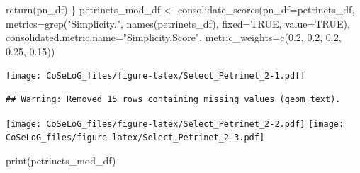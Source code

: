 \documentclass[]{article}
\newenvironment{Shaded}{\begin{snugshade}}{\end{snugshade}}
\newcommand{\KeywordTok}[1]{\textcolor[rgb]{0.94,0.87,0.69}{{#1}}}
\newcommand{\DataTypeTok}[1]{\textcolor[rgb]{0.87,0.87,0.75}{{#1}}}
\newcommand{\FloatTok}[1]{\textcolor[rgb]{0.75,0.75,0.82}{{#1}}}
\newcommand{\StringTok}[1]{\textcolor[rgb]{0.80,0.58,0.58}{{#1}}}
\newcommand{\OtherTok}[1]{\textcolor[rgb]{0.94,0.94,0.56}{{#1}}}
\newcommand{\NormalTok}[1]{\textcolor[rgb]{0.80,0.80,0.80}{{#1}}}
\begin{document}
\begin{Shaded}
\begin{Highlighting}[]
    \KeywordTok{return}\NormalTok{(pn_df)}
\NormalTok{\}}
\NormalTok{petrinets_mod_df <-}\StringTok{ }\KeywordTok{consolidate_scores}\NormalTok{(}\DataTypeTok{pn_df=}\NormalTok{petrinets_df, }
        \DataTypeTok{metrics=}\KeywordTok{grep}\NormalTok{(}\StringTok{"Simplicity."}\NormalTok{, }\KeywordTok{names}\NormalTok{(petrinets_df), }\DataTypeTok{fixed=}\OtherTok{TRUE}\NormalTok{, }\DataTypeTok{value=}\OtherTok{TRUE}\NormalTok{), }
        \DataTypeTok{consolidated.metric.name=}\StringTok{"Simplicity.Score"}\NormalTok{,}
        \DataTypeTok{metric_weights=}\KeywordTok{c}\NormalTok{(}\FloatTok{0.2}\NormalTok{, }\FloatTok{0.2}\NormalTok{, }\FloatTok{0.2}\NormalTok{, }\FloatTok{0.25}\NormalTok{, }\FloatTok{0.15}\NormalTok{))}
\end{Highlighting}
\end{Shaded}

\texttt{[image: CoSeLoG\_files/figure-latex/Select\_Petrinet\_2-1.pdf]}

\begin{verbatim}
## Warning: Removed 15 rows containing missing values (geom_text).
\end{verbatim}

\texttt{[image: CoSeLoG\_files/figure-latex/Select\_Petrinet\_2-2.pdf]}
\texttt{[image: CoSeLoG\_files/figure-latex/Select\_Petrinet\_2-3.pdf]}

\begin{Shaded}
\begin{Highlighting}[]
\KeywordTok{print}\NormalTok{(petrinets_mod_df)}
\end{Highlighting}
\end{Shaded}
\end{document}
